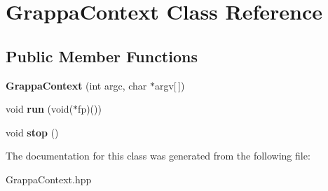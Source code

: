 \hypertarget{class_grappa_context}{}\section{Grappa\+Context Class Reference}
\label{class_grappa_context}
\subsection*{Public Member Functions}
\begin{DoxyCompactItemize}
\item 
\hypertarget{class_grappa_context_acc13cc44a53da592e1f7ce81f9a84b61}{}{\bfseries Grappa\+Context} (int argc, char $\ast$argv\mbox{[}$\,$\mbox{]})\label{class_grappa_context_acc13cc44a53da592e1f7ce81f9a84b61}

\item 
\hypertarget{class_grappa_context_aacb2d930729185106f8aa2ac222b79f3}{}void {\bfseries run} (void($\ast$fp)())\label{class_grappa_context_aacb2d930729185106f8aa2ac222b79f3}

\item 
\hypertarget{class_grappa_context_a5081d79c66a5c6b044e94687aa434d00}{}void {\bfseries stop} ()\label{class_grappa_context_a5081d79c66a5c6b044e94687aa434d00}

\end{DoxyCompactItemize}


The documentation for this class was generated from the following file\+:\begin{DoxyCompactItemize}
\item 
Grappa\+Context.\+hpp\end{DoxyCompactItemize}
